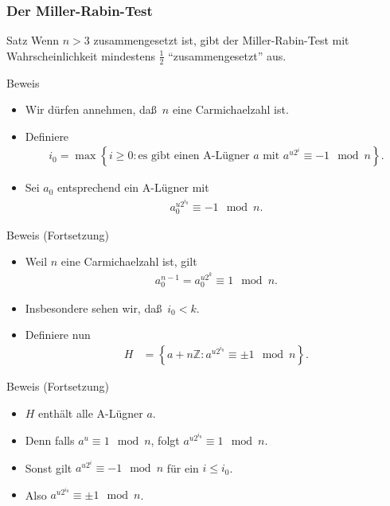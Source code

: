 \documentclass{beamer}
\newcommand\ZZ{\mathbb Z}
\newcommand\cbc[1]{\left\{{#1}\right\}}
\renewcommand{\ae}{\"a}
\newcommand{\ue}{\"u}
\begin{document}
\begin{frame}\frametitle{Der Miller-Rabin-Test}
	\begin{block}{Satz}
		Wenn $n>3$ zusammengesetzt ist, gibt der Miller-Rabin-Test mit Wahrscheinlichkeit mindestens $\frac{1}{2}$ ``zusammengesetzt'' aus.
	\end{block}
	\begin{overprint}
		\begin{block}{Beweis}
			\begin{itemize}
				\item Wir d\ue rfen annehmen, da\ss\ $n$ eine Carmichaelzahl ist.
				\item Definiere
					\begin{align*}
						i_0=\max\cbc{i\geq0:\mbox{es gibt einen A-L\ue gner $a$ mit }a^{u2^i}\equiv-1\mod n}.
					\end{align*}
				\item Sei $a_0$ entsprechend ein A-L\ue gner mit
					\begin{align*}
						a_0^{u2^{i_0}}\equiv-1\mod n.
					\end{align*}
			\end{itemize}
		\end{block}
		\begin{block}{Beweis (Fortsetzung)}
			\begin{itemize}
				\item Weil $n$ eine Carmichaelzahl ist, gilt
					\begin{align*}
						a_0^{n-1}=a_0^{u2^k}\equiv1\mod n.
					\end{align*}
				\item Insbesondere sehen wir, da\ss\ $i_0<k$.
				\item Definiere nun
					\begin{align*}
						H&=\cbc{a+n\ZZ:a^{u2^{i_0}}\equiv\pm1\mod n}.
					\end{align*}
			\end{itemize}
		\end{block}
		\begin{block}{Beweis (Fortsetzung)}
			\begin{itemize}
				\item $H$ enth\ae lt alle A-L\ue gner $a$.
				\item Denn falls $a^u\equiv1\mod n$, folgt $a^{u2^{i_0}}\equiv1\mod n$.
				\item Sonst gilt $a^{u2^i}\equiv-1\mod n$ f\ue r ein $i\leq i_0$.
				\item Also $a^{u2^{i_0}}\equiv\pm1\mod n$.

\end{itemize}
\end{block}
\end{overprint}
\end{frame}
\end{document}
